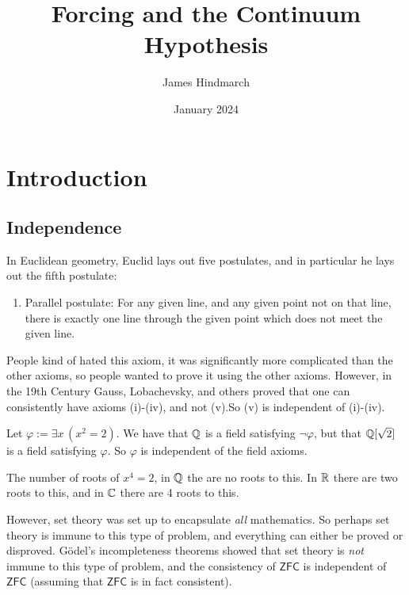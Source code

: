 \documentclass{article}
\title{Forcing and the Continuum Hypothesis}
\author{James Hindmarch}
\date{January 2024}
\begin{document}
\maketitle
\tableofcontents

\newpage
\newlec
\section{Introduction}
\subsection{Independence}
\begin{ex*}
    In Euclidean geometry, Euclid lays out five postulates, and in particular he lays out the fifth postulate: \begin{enumerate}
        \item[(v)] Parallel postulate: For any given line, and any given point not on that line, there is exactly one line through the given point which does not meet the given line.
    \end{enumerate}
    People kind of hated this axiom, it was significantly more complicated than the other axioms, so people wanted to prove it using the other axioms. However, in the 19th Century Gauss, Lobachevsky, and others proved that one can consistently have axioms (i)-(iv), and not (v).\gap So (v) is independent of (i)-(iv).
\end{ex*}
\begin{ex*}
    Let $\varphi := \exists x \, (x^{2}=2)$. We have that $\mathbb{Q}$ is a field satisfying $\neg \varphi$, but that $\mathbb{Q}[\sqrt{2}]$ is a field satisfying $\varphi$. So $\varphi$ is independent of the field axioms.
\end{ex*}
\begin{ex*}
    The number of roots of $x^{4}=2$, in $\mathbb{Q}$ the are no roots to this. In $\mathbb{R}$ there are two roots to this, and in $\mathbb{C}$ there are 4 roots to this.
\end{ex*}
However, set theory was set up to encapsulate \textit{all} mathematics. So perhaps set theory is immune to this type of problem, and everything can either be proved or disproved.\gap
G\"odel's incompleteness theorems showed that set theory is \textit{not} immune to this type of problem, and the consistency of $\mathsf{ZFC}$ is independent of $\mathsf{ZFC}$ (assuming that $\mathsf{ZFC}$ is in fact consistent).
\end{document}
